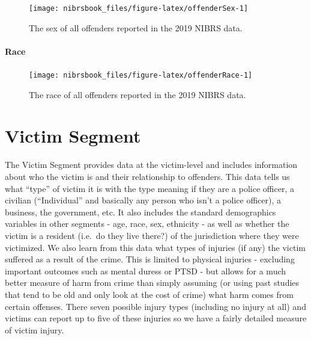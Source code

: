 \documentclass[
  12pt,
  openany]{book}
\begin{document}
\begin{figure}

{\centering \texttt{[image: nibrsbook\_files/figure-latex/offenderSex-1]} 

}

\caption{The sex of all offenders reported in the 2019 NIBRS data.}\label{fig:offenderSex}
\end{figure}

\hypertarget{race}{%
\subsubsection{Race}\label{race}}

\begin{figure}

{\centering \texttt{[image: nibrsbook\_files/figure-latex/offenderRace-1]} 

}

\caption{The race of all offenders reported in the 2019 NIBRS data.}\label{fig:offenderRace}
\end{figure}

\hypertarget{victim-segment-1}{%
\chapter{Victim Segment}\label{victim-segment-1}}

The Victim Segment provides data at the victim-level and includes information about who the victim is and their relationship to offenders. This data tells us what ``type'' of victim it is with the type meaning if they are a police officer, a civilian (``Individual'' and basically any person who isn't a police officer), a business, the government, etc. It also includes the standard demographics variables in other segments - age, race, sex, ethnicity - as well as whether the victim is a resident (i.e.~do they live there?) of the jurisdiction where they were victimized. We also learn from this data what types of injuries (if any) the victim suffered as a result of the crime. This is limited to physical injuries - excluding important outcomes such as mental duress or PTSD - but allows for a much better measure of harm from crime than simply assuming (or using past studies that tend to be old and only look at the cost of crime) what harm comes from certain offenses. There seven possible injury types (including no injury at all) and victims can report up to five of these injuries so we have a fairly detailed measure of victim injury.
\end{document}
